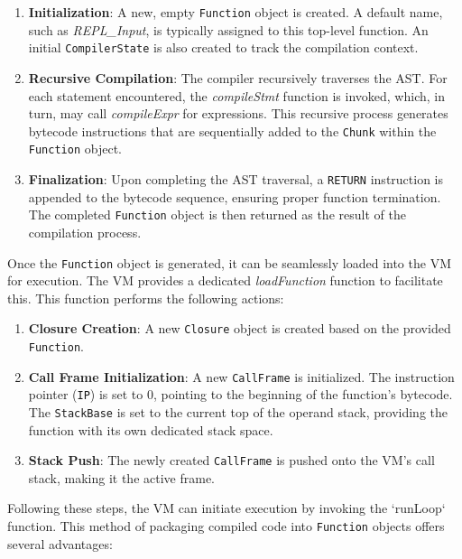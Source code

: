 \begin{enumerate}
    \item \textbf{Initialization}: A new, empty \texttt{Function} object is created.
    A default name, such as \textit{REPL\_Input}, is typically assigned to this top-level function.
    An initial \texttt{CompilerState} is also created to track the compilation context.
    \item \textbf{Recursive Compilation}: The compiler recursively traverses the AST. For each statement 
    encountered, the \textit{compileStmt} function is invoked, which, in turn, may call \textit{compileExpr} for expressions. 
    This recursive process generates bytecode instructions that are sequentially added to the \texttt{Chunk} within the \texttt{Function} object.
    \item \textbf{Finalization}: Upon completing the AST traversal, a \texttt{RETURN} instruction is appended to the bytecode sequence, ensuring proper function termination.
    The completed \texttt{Function} object is then returned as the result of the compilation process.
\end{enumerate}

Once the \texttt{Function} object is generated, it can be seamlessly loaded into the VM for execution.
The VM provides a dedicated \textit{loadFunction} function to facilitate this.
This function performs the following actions:

\begin{enumerate}
    \item \textbf{Closure Creation}: A new \texttt{Closure} object is created based on the provided \texttt{Function}.
    \item \textbf{Call Frame Initialization}: A new \texttt{CallFrame} is initialized.
    The instruction pointer (\texttt{IP}) is set to 0, pointing to the beginning of the function's bytecode.
    The \texttt{StackBase} is set to the current top of the operand stack, providing the function with its own dedicated stack space.
    \item \textbf{Stack Push}: The newly created \texttt{CallFrame} is pushed onto the VM's call stack, making it the active frame.
\end{enumerate}

Following these steps, the VM can initiate execution by invoking the `runLoop` function.
This method of packaging compiled code into \texttt{Function} objects offers several advantages:

